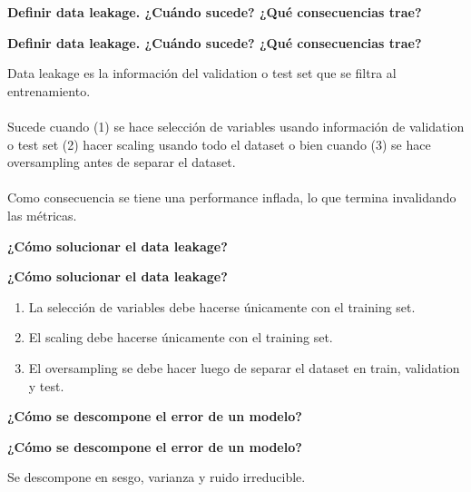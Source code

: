 \documentclass[10pt]{memoir}
\begin{document}
\clearpage
\begin{center}
	\textbf{\Large Definir data leakage. ¿Cuándo sucede? ¿Qué consecuencias trae?} \\
\end{center}

\clearpage
\begin{center}
	\textbf{\Large Definir data leakage. ¿Cuándo sucede? ¿Qué consecuencias trae?} \\
\end{center}
\noindent Data leakage es la información del validation o test set que se filtra al entrenamiento. \\
\\
\noindent Sucede cuando (1) se hace selección de variables usando información de validation o test set (2) hacer scaling usando todo el dataset o bien cuando (3) se hace oversampling antes de separar el dataset. \\
\\
\noindent Como consecuencia se tiene una performance inflada, lo que termina invalidando las métricas.

\clearpage
\begin{center}
	\textbf{\Large ¿Cómo solucionar el data leakage?} \\
\end{center}

\clearpage
\begin{center}
	\textbf{\Large ¿Cómo solucionar el data leakage?} \\
\end{center}
\begin{enumerate}
	\item La selección de variables debe hacerse únicamente con el training set.
	\item El scaling debe hacerse únicamente con el training set.
	\item El oversampling se debe hacer luego de separar el dataset en train, validation y test.
\end{enumerate}


\clearpage
\begin{center}
	\textbf{\Large ¿Cómo se descompone el error de un modelo?} \\
\end{center}

\clearpage
\begin{center}
	\textbf{\Large ¿Cómo se descompone el error de un modelo?} \\
\end{center}
\noindent Se descompone en sesgo, varianza y ruido irreducible.
\end{document}
